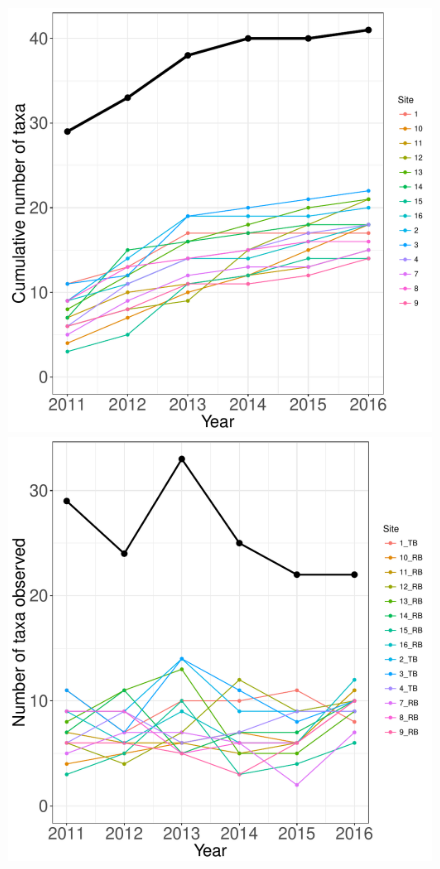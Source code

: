 \documentclass[11pt, oneside]{article}
\begin{document}
\begin{figure}[h!]
\centering
\includegraphics[scale = 0.4]{fce-fish-RehageWet_species_accumulation_curve.pdf}
\includegraphics[scale = 0.4]{fce-fish-RehageWet_num_taxa_over_time.pdf}

\end{figure}
\end{document}
